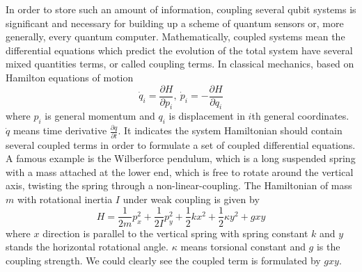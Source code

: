 \documentclass[11pt]{article}
\begin{document}
In order to store such an amount of information, coupling several qubit systems is significant and necessary for building up a scheme of quantum sensors or, more generally, every quantum computer. Mathematically, coupled systems mean the differential equations which predict the evolution of the total system have several mixed quantities terms, or called coupling terms. In classical mechanics, based on Hamilton equations of motion
\begin{equation}
	\dot{q}_i = \frac{\partial H}{\partial p_i}, \ \dot{p}_i = -\frac{\partial H}{\partial q_i}
\end{equation}
where $p_i$ is general momentum and $q_i$ is displacement in $i$th general coordinates. $\dot{q}$ means time derivative $\frac{\partial q}{\partial t}$. It indicates the system Hamiltonian should contain several coupled terms in order to formulate a set of coupled differential equations. A famous example is the Wilberforce pendulum, which is a long suspended spring with a mass attached at the lower end, which is free to rotate around the vertical axis, twisting the spring through a non-linear-coupling\cite{avendano2020closed}. The Hamiltonian of mass $m$ with rotational inertia $I$ under weak coupling is given by 
\begin{equation}
	H = \frac{1}{2m}p_x^2 + \frac{1}{2I} p_y^2 + \frac{1}{2} kx^2 + \frac{1}{2} \kappa y^2 + g x y
\end{equation}
where $x$ direction is parallel to the vertical spring with spring constant $k$ and $y$ stands the horizontal rotational angle. $\kappa$ means torsional constant and $g$ is the coupling strength. We could clearly see the coupled term is formulated by $gxy$. 
\end{document}
